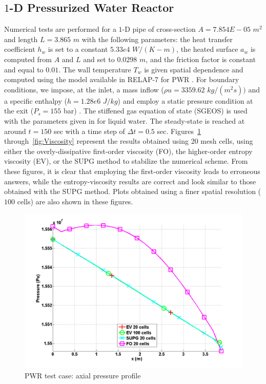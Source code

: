 \subsection{$1$-D Pressurized Water Reactor} \label{sec:1d-pwr}
Numerical tests are performed for a $1$-D pipe of cross-section $A = 7.854E-05$ $m^2$ and length $L=3.865$ $m$ with the following parameters: the heat transfer coefficient $h_w$ is set to a constant $5.33e4$ $W/(K-m)$, the heated surface $a_w$ is computed from $A$ and $L$ and set to $0.0298$ $m$, and the friction factor is constant and equal to $0.01$. The wall temperature $T_w$ is given spatial dependence and computed using the model available in RELAP-7 for PWR \cite{Relap7PWR}. 
For boundary conditions, we impose, at the inlet, a mass inflow ($\rho u = 3359.62$ $kg/(m^2 s))$ and a specific enthalpy ($h = 1.28e6$ $J/kg$) and employ a static pressure condition at the exit ($P_s = 155$ bar) . The stiffened gas equation of state (SGEOS) is used \cite{SGEOS} with the parameters given in  for liquid water. The steady-state is reached at around $t=150$ sec with a time step of $\Delta t = 0.5$ sec. Figures~\ref{fig:Pressure} through~\ref{fig:Viscosity} represent the results obtained using 20 mesh cells, using either the overly-dissipative first-order viscosity (FO), the higher-order entropy viscosity (EV), or the SUPG \cite{SUPG} method to stabilize the numerical scheme. From these figures, it is clear that employing the first-order viscosity leads to erroneous answers, while the entropy-viscosity results are correct and look similar to those obtained with the SUPG method. Plots obtained using a finer spatial resolution ($100$ cells) are also shown in these figures.
%
\begin{figure}[H]
\centering
\includegraphics[width=\textwidth]{figures/PWR_stt_pressure.png}
\caption{PWR test case: axial pressure profile}
\label{fig:Pressure}
\end{figure}
